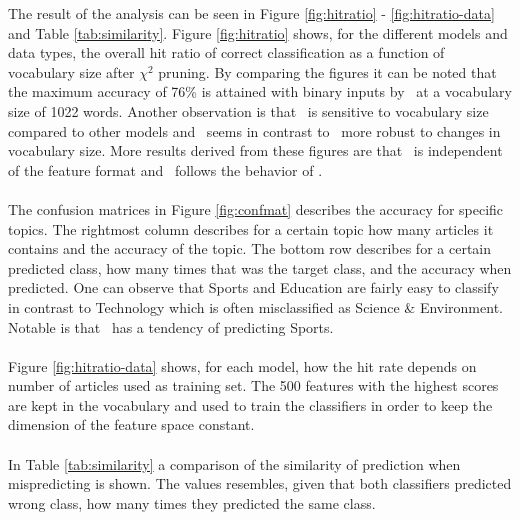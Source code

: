 \label{sec:result}
The result of the analysis can be seen in Figure \ref{fig:hitratio} - \ref{fig:hitratio-data} and Table \ref{tab:similarity}. Figure \ref{fig:hitratio} shows, for the different models and data types, the overall hit ratio of correct classification as a function of vocabulary size after $\chi^2$ pruning. By comparing the figures it can be noted that the maximum accuracy of 76\% is attained with binary inputs by \mn\ at a vocabulary size of 1022 words. Another observation is that \bn\ is sensitive to vocabulary size compared to other models and \svm\  seems in contrast to \bn\ more robust to changes in vocabulary size. More results derived from these figures are that \rf\ is independent of the feature format and \hy\ follows the behavior of \mn.
\\\\
The confusion matrices in Figure \ref{fig:confmat} describes the accuracy for specific topics. The rightmost column describes for a certain topic how many articles it contains and the accuracy of the topic. The bottom row describes for a certain predicted class, how many times that was the target class, and the accuracy when predicted. One can observe that Sports and Education are fairly easy to classify in contrast to Technology which is often misclassified as Science \& Environment. Notable is that \rf\ has a tendency of predicting Sports.
\\\\
Figure \ref{fig:hitratio-data} shows, for each model, how the hit rate depends on number of articles used as training set. The 500 features with the highest scores are kept in the vocabulary and used to train the classifiers in order to keep the dimension of the feature space constant.
\\\\
In Table \ref{tab:similarity} a comparison of the similarity of prediction when mispredicting is shown. The values resembles, given that both classifiers predicted wrong class, how many times they predicted the same class.

\onecolumn

\onecolumn


\twocolumn
